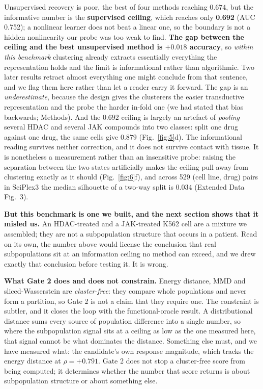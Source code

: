 \documentclass[11pt,letterpaper]{article}
\begin{document}
Unsupervised recovery is poor, the best of four methods reaching $0.674$, but the informative number
is the \textbf{supervised ceiling}, which reaches only \textbf{0.692} (AUC 0.752); a nonlinear
learner does not beat a linear one, so the boundary is not a hidden nonlinearity our probe was too
weak to find. \textbf{The gap between the ceiling and the best unsupervised method is
$\mathbf{+0.018}$ accuracy}, so \emph{within this benchmark} clustering already extracts essentially
everything the representation holds and the limit is informational rather than algorithmic. Two
later results retract almost everything one might conclude from that sentence, and we flag them here
rather than let a reader carry it forward. The gap is an \emph{underestimate}, because the design
gives the clusterers the easier transductive representation and the probe the harder in-fold one
(we had stated that bias backwards; Methods). And the $0.692$ ceiling is largely an artefact of
\emph{pooling} several HDAC and several JAK compounds into two classes: split one drug against one
drug, the same cells give $0.879$ (Fig.~\ref{fig:5}d). The informational reading survives neither
correction, and it does not survive contact with tissue. It is nonetheless a measurement rather
than an insensitive probe: raising the separation between the two states artificially makes the
ceiling pull away from clustering exactly as it should (Fig.~\ref{fig:6}f), and across 529
(cell line, drug) pairs in SciPlex3 the median silhouette of a two-way split is $0.034$ (Extended
Data Fig.~3).

\textbf{But this benchmark is one we built, and the next section shows that it misled us.} An
HDAC-treated and a JAK-treated K562 cell are a mixture we assembled; they are not a subpopulation
structure that occurs in a patient. Read on its own, the number above would license the conclusion
that real subpopulations sit at an information ceiling no method can exceed, and we drew exactly
that conclusion before testing it. It is wrong.

\textbf{What Gate 2 does and does not constrain.} Energy distance, MMD and sliced-Wasserstein are
\emph{cluster-free}: they compare whole populations and never form a partition, so Gate 2 is not a
claim that they require one. The constraint is subtler, and it closes the loop with the
functional-oracle result. A distributional distance sums every source of population difference into
a single number, so where the subpopulation signal sits at a ceiling as low as the one measured
here, that signal cannot be what dominates the distance. Something else must, and we have measured
what: the candidate's own response magnitude, which tracks the energy distance at
$\rho = +0.791$. Gate 2 does not stop a cluster-free score from being computed; it determines
whether the number that score returns is about subpopulation structure or about something else.
\end{document}
